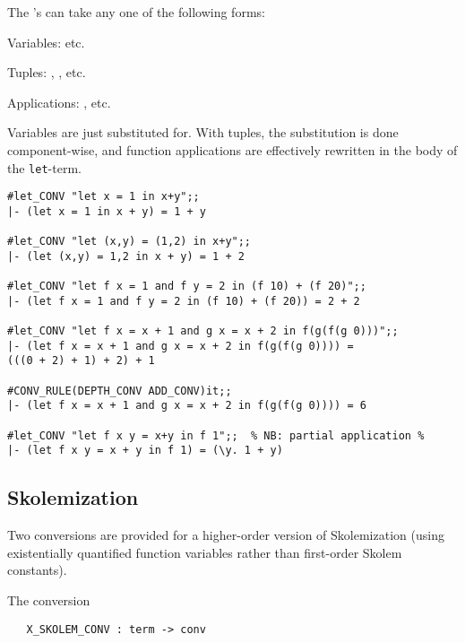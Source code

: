\noindent The 's can take any one of the following forms:

\begin{myenumerate}
\item Variables:     etc.
\item Tuples:   , ,  etc.
\item Applications: ,  etc.
\end{myenumerate}

\noindent Variables are just substituted for. With tuples, the substitution is
done component-wise, and function applications are effectively
rewritten in the body of the {\tt let}-term.

\setcounter{sessioncount}{1}
\begin{session}\begin{verbatim}
#let_CONV "let x = 1 in x+y";;
|- (let x = 1 in x + y) = 1 + y

#let_CONV "let (x,y) = (1,2) in x+y";;
|- (let (x,y) = 1,2 in x + y) = 1 + 2

#let_CONV "let f x = 1 and f y = 2 in (f 10) + (f 20)";;
|- (let f x = 1 and f y = 2 in (f 10) + (f 20)) = 2 + 2

#let_CONV "let f x = x + 1 and g x = x + 2 in f(g(f(g 0)))";;
|- (let f x = x + 1 and g x = x + 2 in f(g(f(g 0)))) =
(((0 + 2) + 1) + 2) + 1

#CONV_RULE(DEPTH_CONV ADD_CONV)it;;
|- (let f x = x + 1 and g x = x + 2 in f(g(f(g 0)))) = 6

#let_CONV "let f x y = x+y in f 1";;  % NB: partial application %
|- (let f x y = x + y in f 1) = (\y. 1 + y)  
\end{verbatim}\end{session}

\subsection{Skolemization}

Two conversions are provided for a higher-order version of
Skolemization (using existentially quantified function variables
rather than first-order Skolem constants).

The conversion 

\begin{boxed}
\begin{verbatim}
   X_SKOLEM_CONV : term -> conv
\end{verbatim}\end{boxed}

